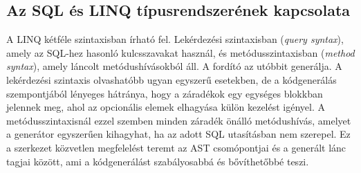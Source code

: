 \documentclass[a4paper,12pt]{article}
\begin{document}
\subsection{Az SQL és LINQ típusrendszerének kapcsolata}

A LINQ kétféle szintaxisban írható fel. Lekérdezési szintaxisban (\emph{query syntax}), amely az SQL-hez hasonló kulcsszavakat használ, és metódusszintaxisban (\emph{method syntax}), amely láncolt metódushívásokból áll. A fordító az utóbbit generálja. A lekérdezési szintaxis olvashatóbb ugyan egyszerű esetekben, de a kódgenerálás szempontjából lényeges hátránya, hogy a záradékok egy egységes blokkban jelennek meg, ahol az opcionális elemek elhagyása külön kezelést igényel. A metódusszintaxisnál ezzel szemben minden záradék önálló metódushívás, amelyet a generátor egyszerűen kihagyhat, ha az adott SQL utasításban nem szerepel. Ez a szerkezet közvetlen megfelelést teremt az AST csomópontjai és a generált lánc tagjai között, ami a kódgenerálást szabályosabbá és bővíthetőbbé teszi.
\end{document}
